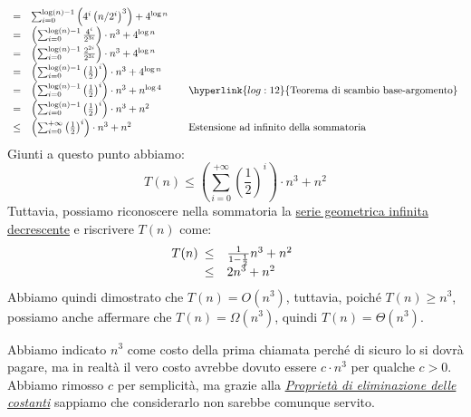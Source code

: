 \begin{eg}
\[\begin{array}[t]{cll}
        = & \sum_{i=0}^{\log(n)-1}\left(4^i\left(n/2^i\right)^3\right)+4^{\log n}\\
        = & \left(\sum_{i=0}^{\log(n)-1}\frac{4^i}{2^{3i}}\right)\cdot n^3 + 4^{\log n}\\
        = & \left(\sum_{i=0}^{\log(n)-1}\frac{2^{2i}}{2^{3i}}\right)\cdot n^3 + 4^{\log n}\\
        = & \left(\sum_{i=0}^{\log(n)-1}\left(\frac{1}{2}\right)^i\right)\cdot n^3 + 4^{\log n}\\
        = & \left(\sum_{i=0}^{\log(n)-1}\left(\frac{1}{2}\right)^i\right)\cdot n^3 + n^{\log 4} &
        \quad\hyperlink{log:12}{\text{Teorema di scambio base-argomento}}\\
        = & \left(\sum_{i=0}^{\log(n)-1}\left(\frac{1}{2}\right)^i\right)\cdot n^3 + n^2\\
        \leq & \left(\sum_{i=0}^{+\infty}\left(\frac{1}{2}\right)^i\right)\cdot n^3 + n^2 &
        \quad\text{Estensione ad infinito della sommatoria}\\
    \end{array}\]
    Giunti a questo punto abbiamo:
    \[T(n)\leq\left(\sum_{i=0}^{+\infty}\left(\frac{1}{2}\right)^i\right)\cdot n^3 + n^2\]
    Tuttavia, possiamo riconoscere nella sommatoria la \hyperlink{ser:4}
    {serie geometrica infinita decrescente} e riscrivere $T(n)$ come:
    \[T(n)\begin{array}[t]{cl}
        \leq & \frac{1}{1-\frac{1}{2}}n^3+n^2\\
        \leq & 2n^3+n^2
    \end{array}\]
    Abbiamo quindi dimostrato che $T(n)=O(n^3)$, tuttavia, poiché $T(n)\geq n^3$,
    possiamo anche affermare che $T(n)=\Omega(n^3)$, quindi $T(n)=\Theta(n^3)$.
\end{eg}

\begin{note}
    Abbiamo indicato $n^3$ come costo della prima chiamata perché di sicuro
    lo si dovrà pagare, ma in realtà il vero costo avrebbe dovuto essere
    $c\cdot n^3$ per qualche $c>0$. Abbiamo rimosso $c$ per semplicità, ma
    grazie alla \hyperlink{prop:elimcost}{\emph{Proprietà di eliminazione
    delle costanti}} sappiamo che considerarlo non sarebbe comunque servito.
\end{note}

